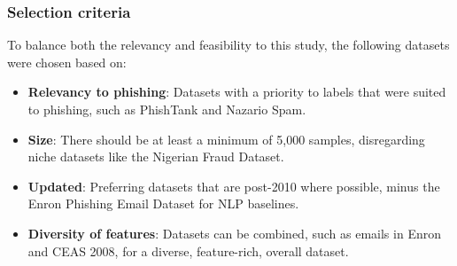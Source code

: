 
\subsubsection*{Selection criteria} 
To balance both the relevancy and feasibility to this study, the following datasets were chosen based on:

\begin{itemize}
  \item \textbf{Relevancy to phishing}: Datasets with a priority to labels that were suited to phishing, such as PhishTank and Nazario Spam.
  \item \textbf{Size}: There should be at least a minimum of 5,000 samples, disregarding niche datasets like the Nigerian Fraud Dataset.
  \item \textbf{Updated}: Preferring datasets that are post-2010 where possible, minus the Enron Phishing Email Dataset for NLP baselines.
  \item \textbf{Diversity of features}: Datasets can be combined, such as emails in Enron and CEAS 2008, for a diverse, feature-rich, overall dataset.
\end{itemize}
